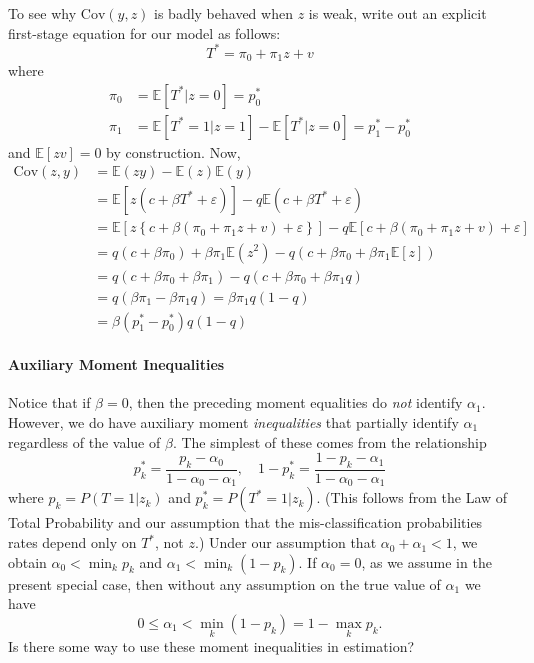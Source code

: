 \documentclass[12pt]{article}
\begin{document}
To see why $\mbox{Cov}(y,z)$ is badly behaved when $z$ is weak, write out an explicit first-stage equation for our model as follows:
\[
T^* = \pi_0 + \pi_1 z + v
\]
where
\begin{align*}
\pi_0 &= \mathbb{E}[T^*|z=0] = p^*_0\\
\pi_1 &= \mathbb{E}[T^*=1|z=1] - \mathbb{E}[T^*|z=0] = p^*_1 - p^*_0
\end{align*}
and $\mathbb{E}[zv]=0$ by construction.
Now,
\begin{align*}
  \mbox{Cov}(z,y) &= \mathbb{E}(zy) - \mathbb{E}(z)\mathbb{E}(y)\\
  &=\mathbb{E}\left[z\left( c + \beta T^* + \varepsilon \right) \right] - q \mathbb{E}\left( c + \beta T^* + \varepsilon \right)\\
  &=\mathbb{E}\left[z\left\{ c + \beta \left( \pi_0 + \pi_1 z + v \right) + \varepsilon \right\} \right] - q \mathbb{E}\left[ c + \beta \left( \pi_0 + \pi_1 z + v \right) + \varepsilon \right]\\
  &= q (c + \beta \pi_0) + \beta \pi_1 \mathbb{E}(z^2) - q\left( c + \beta \pi_0 + \beta \pi_1 \mathbb{E}[z] \right) \\
  &= q (c + \beta \pi_0 + \beta \pi_1)  - q\left( c + \beta \pi_0 + \beta \pi_1 q \right) \\
  &= q(\beta \pi_1  - \beta \pi_1 q) = \beta \pi_1 q(1 - q)\\
  &= \beta (p^*_1 - p^*_0) q(1-q)
\end{align*}



\paragraph{Auxiliary Moment Inequalities}
Notice that if $\beta=0$, then the preceding moment equalities do \emph{not} identify $\alpha_1$.
However, we do have auxiliary moment \emph{inequalities} that partially identify $\alpha_1$ regardless of the value of $\beta$.
The simplest of these comes from the relationship  
\[
  p_k^* = \frac{p_k - \alpha_0}{1 - \alpha_0 - \alpha_1}, \quad
  1 - p_k^* = \frac{1 - p_k - \alpha_1}{1 - \alpha_0 - \alpha_1}
\]
where $p_k = P(T=1|z_k)$ and $p_k^* = P(T^*=1|z_k)$.
(This follows from the Law of Total Probability and our assumption that the mis-classification probabilities rates depend only on $T^*$, not $z$.)
Under our assumption that $\alpha_0 + \alpha_1 < 1$, we obtain $\alpha_0 < \min_k p_k$ and $\alpha_1 < \min_k (1 - p_k)$.
If $\alpha_0 = 0$, as we assume in the present special case, then without any assumption on the true value of $\alpha_1$ we have 
\[0 \leq \alpha_1 < \min_k (1 - p_k) = 1 - \max_k p_k.\] 
Is there some way to use these moment inequalities in estimation?
\end{document}
